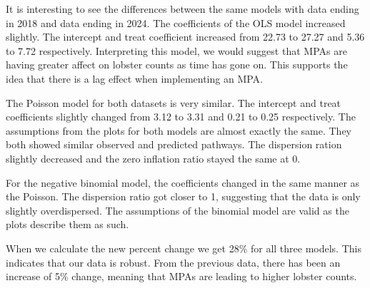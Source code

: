 \documentclass[
]{article}
\begin{document}
It is interesting to see the differences between the same models with
data ending in 2018 and data ending in 2024. The coefficients of the OLS
model increased slightly. The intercept and treat coefficient increased
from 22.73 to 27.27 and 5.36 to 7.72 respectively. Interpreting this
model, we would suggest that MPAs are having greater affect on lobster
counts as time has gone on. This supports the idea that there is a lag
effect when implementing an MPA.

The Poisson model for both datasets is very similar. The intercept and
treat coefficients slightly changed from 3.12 to 3.31 and 0.21 to 0.25
respectively. The assumptions from the plots for both models are almost
exactly the same. They both showed similar observed and predicted
pathways. The dispersion ration slightly decreased and the zero
inflation ratio stayed the same at 0.

For the negative binomial model, the coefficients changed in the same
manner as the Poisson. The dispersion ratio got closer to 1, suggesting
that the data is only slightly overdispersed. The assumptions of the
binomial model are valid as the plots describe them as such.

When we calculate the new percent change we get 28\% for all three
models. This indicates that our data is robust. From the previous data,
there has been an increase of 5\% change, meaning that MPAs are leading
to higher lobster counts.
\end{document}
